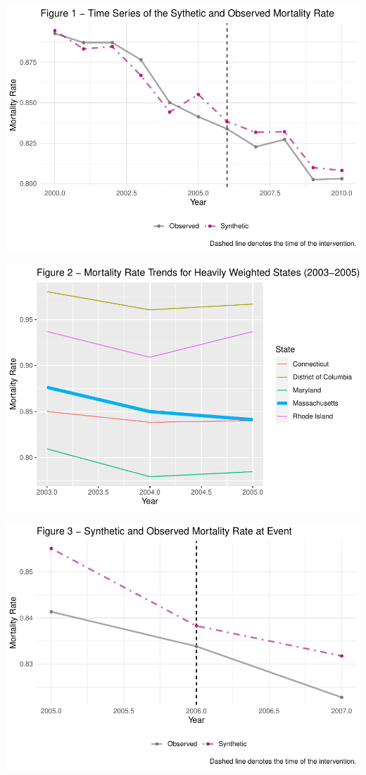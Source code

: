 \documentclass[
]{article}
\begin{document}
\includegraphics{report_files/figure-latex/figure1-1.pdf}

\includegraphics{report_files/figure-latex/figure2-1.pdf}

\includegraphics{report_files/figure-latex/figure3-1.pdf}
\end{document}
